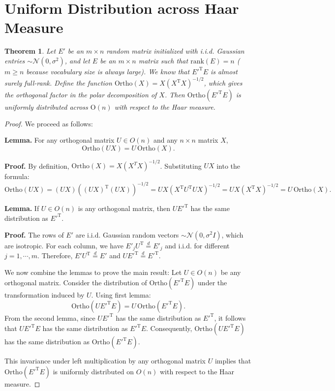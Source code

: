 \documentclass{article} %
\newtheorem{thm}{Theorem}
\begin{document}
\section{Uniform Distribution across Haar Measure}
\label{app:uniform}
\begin{thm}
Let $E'$ be an $m \times n$ random matrix initialized with i.i.d. Gaussian entries $\sim \mathcal{N}(0, \sigma^2)$, 
and let $E$ be an $m \times n$ matrix such that $\mathrm{rank}(E) = n$ ($m \ge n$ because vocabulary size is always large). 
We know that $E'^{\text{T}}E$ is almost surely full-rank. Define the function $\mathrm{Ortho}(X) = X(X^{\text{T}} X)^{-1/2}$, 
which gives the orthogonal factor in the polar decomposition of $X$. Then $\mathrm{Ortho}(E'^{\text{T}}E)$ is uniformly distributed across $\mathrm{O}(n)$ with respect to the Haar measure.
\end{thm}

\begin{proof}
We proceed as follows:

\textbf{Lemma. } For any orthogonal matrix $U \in O(n)$ and any $n \times n$ matrix $X$, 
\[
\mathrm{Ortho}(UX) = U \, \mathrm{Ortho}(X).
\]

\textbf{Proof. } By definition, $\mathrm{Ortho}(X) = X(X^T X)^{-1/2}$. Substituting $UX$ into the formula:
\[
\mathrm{Ortho}(UX) = (UX)\left((UX)^\text{T}(UX)\right)^{-1/2} = UX\left(X^{\text{T}}U^{\text{T}}UX\right)^{-1/2} =  UX\left(X^{\text{T}}X\right)^{-1/2} = U \, \mathrm{Ortho}(X).
\]

\textbf{Lemma. }  If $U \in O(n)$ is any orthogonal matrix, then $UE'^{\text{T}}$ has the same distribution as $E'^{\text{T}}$.

\textbf{Proof. } The rows of $E'$ are i.i.d. Gaussian random vectors $\sim \mathcal{N}(0, \sigma^2I)$, which are isotropic. For each column, we have $E'_j U^{\text{T}} \overset{d}{=} E'_{j}$ and i.i.d. for different $j=1, \cdots, m$. Therefore, $E'U^{\text{T}} \overset{d}{=} E'$ and $UE'^{\text{T}} \overset{d}{=} E'^{\text{T}}$.

We now combine the lemmas to prove the main result: Let $U \in O(n)$ be any orthogonal matrix. Consider the distribution of $\mathrm{Ortho}(E'^{\text{T}}E)$ under the transformation induced by $U$. Using first lemma:
\[
\mathrm{Ortho}(U E'^{\text{T}}E) = U \, \mathrm{Ortho}(E'^{\text{T}}E).
\]
From the second lemma, since $U E'^{\text{T}}$ has the same distribution as $E'^{\text{T}}$, it follows that $U E'^{\text{T}}E$ has the same distribution as $E'^{\text{T}}E$. Consequently, $\mathrm{Ortho}(U E'^{\text{T}}E)$ has the same distribution as $\mathrm{Ortho}(E'^{\text{T}}E)$. 

This invariance under left multiplication by any orthogonal matrix $U$ implies that $\mathrm{Ortho}(E'^{\text{T}}E)$ is uniformly distributed on $O(n)$ with respect to the Haar measure.
\end{proof}
\end{document}
